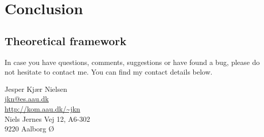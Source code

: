 {}
\chapter{Conclusion} %

\section{Theoretical framework}


In case you have questions, comments, suggestions or have found a bug, please do not hesitate to contact me. You can find my contact details below.
  \begin{center}
    Jesper Kjær Nielsen\\
    \href{mailto: jkn@es.aau.dk}{jkn@es.aau.dk}\\
    \href{http://kom.aau.dk/~jkn}{http://kom.aau.dk/\textasciitilde jkn}\\
    Niels Jernes Vej 12, A6-302\\
    9220 Aalborg Ø
  \end{center}
 
